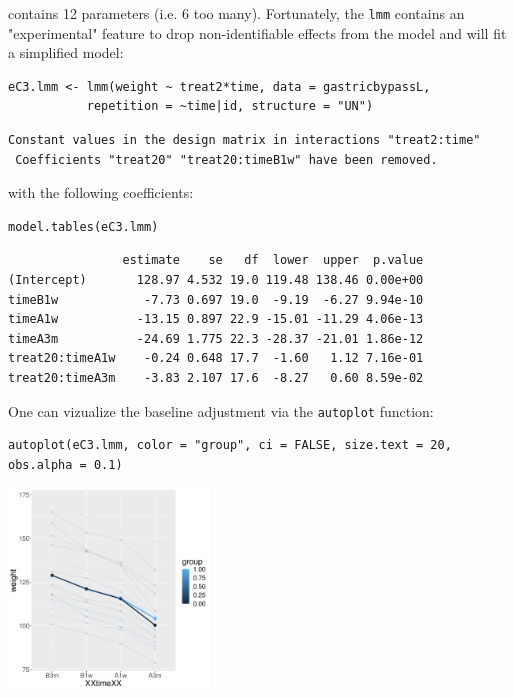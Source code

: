 \documentclass[12pt]{article}
\begin{document}
contains 12 parameters (i.e. 6 too many). Fortunately, the \texttt{lmm}
contains an "experimental" feature to drop non-identifiable effects
from the model and will fit a simplified model:
\lstset{language=r,label= ,caption= ,captionpos=b,numbers=none}
\begin{lstlisting}
eC3.lmm <- lmm(weight ~ treat2*time, data = gastricbypassL,
	       repetition = ~time|id, structure = "UN")
\end{lstlisting}

\begin{verbatim}
Constant values in the design matrix in interactions "treat2:time"
 Coefficients "treat20" "treat20:timeB1w" have been removed.
\end{verbatim}


with the following coefficients:
\lstset{language=r,label= ,caption= ,captionpos=b,numbers=none}
\begin{lstlisting}
model.tables(eC3.lmm)
\end{lstlisting}

\begin{verbatim}
                estimate    se   df  lower  upper  p.value
(Intercept)       128.97 4.532 19.0 119.48 138.46 0.00e+00
timeB1w            -7.73 0.697 19.0  -9.19  -6.27 9.94e-10
timeA1w           -13.15 0.897 22.9 -15.01 -11.29 4.06e-13
timeA3m           -24.69 1.775 22.3 -28.37 -21.01 1.86e-12
treat20:timeA1w    -0.24 0.648 17.7  -1.60   1.12 7.16e-01
treat20:timeA3m    -3.83 2.107 17.6  -8.27   0.60 8.59e-02
\end{verbatim}


One can vizualize the baseline adjustment via the \texttt{autoplot} function:
\lstset{language=r,label= ,caption= ,captionpos=b,numbers=none}
\begin{lstlisting}
autoplot(eC3.lmm, color = "group", ci = FALSE, size.text = 20, obs.alpha = 0.1) 
\end{lstlisting}

\begin{center}
\includegraphics[width=0.4\textwidth]{./figures/gg-baseAdj.pdf}
\end{center}
\end{document}
